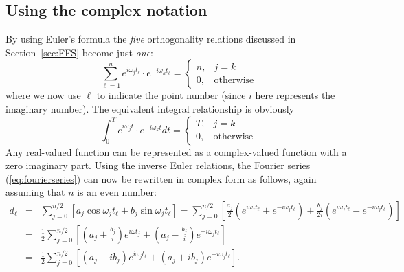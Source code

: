 \subsection{Using the complex notation}
By using Euler's formula the \emph{five} orthogonality relations discussed in Section~\ref{sec:FFS} become just \emph{one}:
\begin{equation}
\sum^n_{\ell=1} e^{i \omega_j t_{\ell}} \cdot e^{-i \omega_k t_{\ell}} =
\left \{ \begin{array}{cc}
n, & j=k \\[12pt]
0, & \mbox{otherwise}
\end{array} \right.
\label{eq:DA2_16.8}
\end{equation}
where we now use $\ell$ to indicate the point number (since $i$ here represents the imaginary number).
The equivalent integral relationship is obviously
\begin{equation}
\int^T_{0} e^{i \omega_j t} \cdot e^{-i \omega_k t} dt =
\left \{ \begin{array}{cc}
T, & j=k \\[12pt]
0, & \mbox{otherwise}
\end{array} \right.
\label{eq:orthocomplex}
\end{equation}
Any real-valued function can be represented as a complex-valued function with a zero
imaginary part.
Using the inverse Euler relations, the Fourier series (\ref{eq:fourierseries}) can now be rewritten in complex form
as follows, again assuming that $n$ is an even number:
\begin{equation}
\begin{array}{rcl}
d_{\ell} & = & \displaystyle \sum^{n/2}_{j=0} \left [ a_j \cos \omega_j t_{\ell} + b_j \sin \omega_j t_{\ell} \right] =
\displaystyle \sum^{n/2}_{j=0}
\left [ \frac{a_j}{2} \left (e^{i\omega_j t_{\ell}} + e^{-i\omega_j t_{\ell}} \right ) +
\frac{b_j}{2i} \left (e^{i\omega_j t_{\ell}} - e^{-i\omega_j t_{\ell}} \right ) \right] \\[14pt]
& = & \frac{1}{2}\displaystyle \sum^{n/2}_{j=0} \left [\left (a_j + \frac{b_j}{i} \right) e^{i\omega t_j}
+ \left (a_j - \frac{b_j}{i} \right ) e^{- i \omega_j t_{\ell}} \right ] \\[14pt]
& = & \displaystyle \frac{1}{2} \sum^{n/2}_{j=0} \left [ \left (a_j - ib_j \right ) e^{i \omega_j t_{\ell}} + \left (a_j + ib_j \right)
e^{-i \omega_j t_{\ell}} \right ].
\end{array}
\label{eq:DA2_16.10}
\end{equation}
